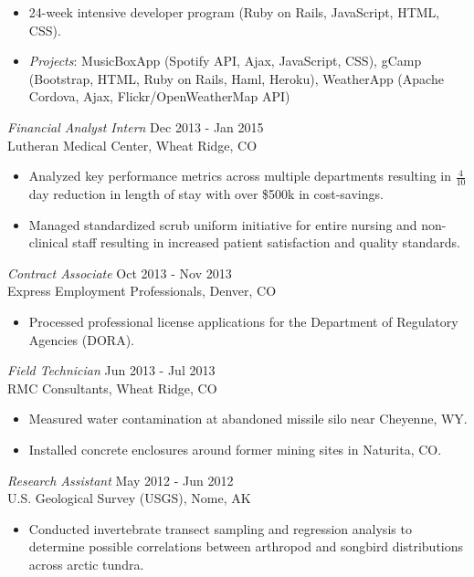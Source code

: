 \documentclass{/Users/alexemrie/Documents/LaTeX/res/res}
\begin{document}
\begin{resume}
   \begin{itemize} \itemsep -2pt %
   \item 24-week intensive developer program (Ruby on Rails, JavaScript, HTML, CSS). 
   \item \textit{Projects}: MusicBoxApp (Spotify API, Ajax, JavaScript, CSS), gCamp (Bootstrap, HTML, Ruby on Rails, Haml, Heroku), WeatherApp (Apache Cordova, Ajax, Flickr/OpenWeatherMap API)
   \end{itemize}

{\sl Financial Analyst Intern} \hfill        Dec 2013 - Jan 2015 \\
Lutheran Medical Center, Wheat Ridge, CO
  
   \begin{itemize} \itemsep -2pt %
   \item Analyzed key performance metrics across multiple departments resulting in  \( \frac{4}{10} \) day reduction in length of stay with over \$500k in cost-savings.
   \item  Managed standardized scrub uniform initiative for entire nursing and non-clinical staff resulting in increased patient satisfaction and quality standards.
   \end{itemize}
   
{\sl Contract Associate} \hfill    Oct 2013 - Nov 2013\\
Express Employment Professionals, Denver, CO

 \begin{itemize} \itemsep -2pt
  \item  Processed professional license applications for the Department of Regulatory Agencies (DORA).
\end{itemize} \vspace{-6pt}

{\sl Field Technician} \hfill    Jun 2013 - Jul 2013\\
 RMC Consultants, Wheat Ridge, CO

 \begin{itemize} \itemsep -2pt
  \item  Measured water contamination at abandoned missile silo near Cheyenne, WY.
  \item  Installed concrete enclosures around former mining sites in Naturita, CO.
\end{itemize} \vspace{-6pt}
  
{\sl Research Assistant} \hfill  May 2012 - Jun 2012 \\
U.S. Geological Survey (USGS), Nome, AK
  \begin{itemize}
  \item  Conducted invertebrate transect sampling and regression analysis to determine possible correlations between arthropod and songbird distributions across arctic tundra.
 \end{itemize}


\end{resume}
\end{document}
